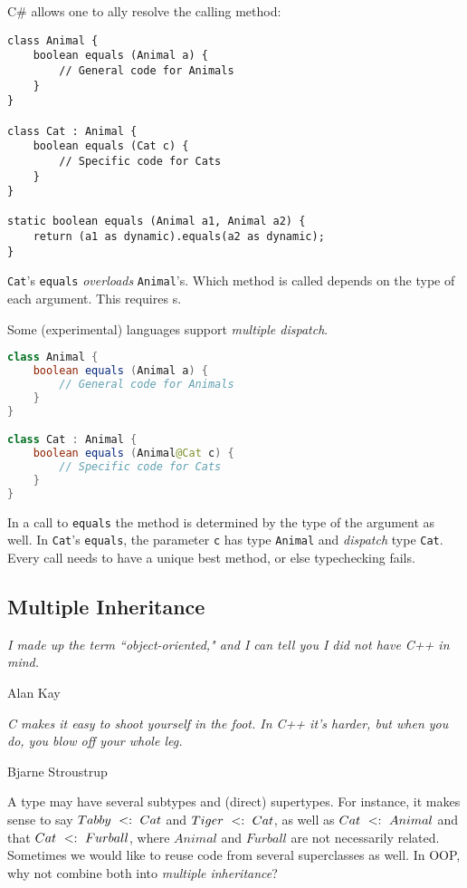 \documentclass{article}
\begin{document}
\begin{example}
C\# allows one to \dynamic{}ally resolve the calling method:
\begin{lstlisting}[language = {[Sharp]C}]
class Animal {
    boolean equals (Animal a) {
        // General code for Animals
    }
}

class Cat : Animal {
    boolean equals (Cat c) {
        // Specific code for Cats
    }
}

static boolean equals (Animal a1, Animal a2) {
    return (a1 as dynamic).equals(a2 as dynamic);
}
\end{lstlisting}
\texttt{Cat}'s \texttt{equals} \textit{overloads} \texttt{Animal}'s. Which method is called depends on the \textit{\runtime{}} type of each argument. This requires \runtimecheck{}s.
\end{example}

\begin{example}
Some (experimental) languages support \textit{multiple dispatch}.
\begin{lstlisting}[language=Java]
class Animal {
    boolean equals (Animal a) {
        // General code for Animals
    }
}

class Cat : Animal {
    boolean equals (Animal@Cat c) {
        // Specific code for Cats
    }
}
\end{lstlisting}
In a call to \texttt{equals} the method is determined by the \dynamic{} type of the argument as well.
In \texttt{Cat}'s \texttt{equals}, the parameter \texttt{c} has \static{} type \texttt{Animal} and \textit{dispatch} type \texttt{Cat}. Every call needs to have a unique best method, or else typechecking fails.
\end{example}

\subsection{Multiple Inheritance}

\epigraph{\itshape I made up the term ``object-oriented," and I can tell you I did not have C++ in mind.}{Alan Kay}

\epigraph{\itshape C makes it easy to shoot yourself in the foot. In C++ it's harder, but when you do, you blow off your whole leg.}{Bjarne Stroustrup}

A type may have several subtypes and (direct) supertypes.
For instance, it makes sense to say $Tabby ~ <: ~ Cat$ and $Tiger ~ <: ~ Cat$, as well as $Cat ~ <: ~ Animal$ and that $Cat ~ <: ~ Furball$, where $Animal$ and $Furball$ are not necessarily related. Sometimes we would like to reuse code from several superclasses as well. In OOP, why not combine both into \textit{multiple inheritance}?
\end{document}
